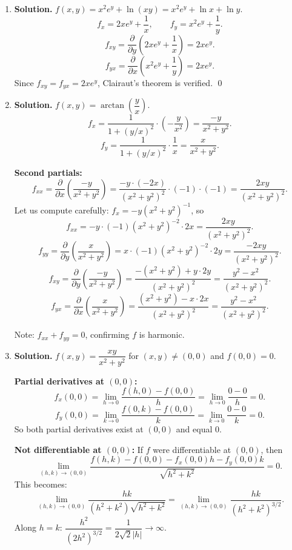 \begin{enumerate}
All mixed partials satisfy $f_{xy} = f_{yx}$, $f_{xz} = f_{zx}$, $f_{yz} = f_{zy}$.

\item \textbf{Solution.}
$f(x,y) = x^2e^y + \ln(xy) = x^2e^y + \ln x + \ln y$.
\[
f_x = 2xe^y + \frac{1}{x}, \qquad f_y = x^2e^y + \frac{1}{y}.
\]
\[
f_{xy} = \frac{\partial}{\partial y}\left(2xe^y + \frac{1}{x}\right) = 2xe^y.
\]
\[
f_{yx} = \frac{\partial}{\partial x}\left(x^2e^y + \frac{1}{y}\right) = 2xe^y.
\]
Since $f_{xy} = f_{yx} = 2xe^y$, Clairaut's theorem is verified. \qed

\item \textbf{Solution.}
$f(x,y) = \arctan\!\left(\dfrac{y}{x}\right)$.
\[
f_x = \frac{1}{1+(y/x)^2} \cdot \left(-\frac{y}{x^2}\right) = \frac{-y}{x^2+y^2}.
\]
\[
f_y = \frac{1}{1+(y/x)^2} \cdot \frac{1}{x} = \frac{x}{x^2+y^2}.
\]

\textbf{Second partials:}
\[
f_{xx} = \frac{\partial}{\partial x}\left(\frac{-y}{x^2+y^2}\right) = \frac{-y \cdot (-2x)}{(x^2+y^2)^2} \cdot (-1) \cdot (-1) = \frac{2xy}{(x^2+y^2)^2}.
\]
Let us compute carefully: $f_x = -y(x^2+y^2)^{-1}$, so
\[
f_{xx} = -y \cdot (-1)(x^2+y^2)^{-2} \cdot 2x = \frac{2xy}{(x^2+y^2)^2}.
\]
\[
f_{yy} = \frac{\partial}{\partial y}\left(\frac{x}{x^2+y^2}\right) = x \cdot (-1)(x^2+y^2)^{-2}\cdot 2y = \frac{-2xy}{(x^2+y^2)^2}.
\]
\[
f_{xy} = \frac{\partial}{\partial y}\left(\frac{-y}{x^2+y^2}\right) = \frac{-(x^2+y^2) + y \cdot 2y}{(x^2+y^2)^2} = \frac{y^2 - x^2}{(x^2+y^2)^2}.
\]
\[
f_{yx} = \frac{\partial}{\partial x}\left(\frac{x}{x^2+y^2}\right) = \frac{(x^2+y^2) - x \cdot 2x}{(x^2+y^2)^2} = \frac{y^2 - x^2}{(x^2+y^2)^2}.
\]

Note: $f_{xx} + f_{yy} = 0$, confirming $f$ is harmonic.

\item \textbf{Solution.}
$f(x,y) = \dfrac{xy}{x^2+y^2}$ for $(x,y) \neq (0,0)$ and $f(0,0) = 0$.

\textbf{Partial derivatives at $(0,0)$:}
\[
f_x(0,0) = \lim_{h \to 0}\frac{f(h,0)-f(0,0)}{h} = \lim_{h \to 0}\frac{0 - 0}{h} = 0.
\]
\[
f_y(0,0) = \lim_{k \to 0}\frac{f(0,k)-f(0,0)}{k} = \lim_{k \to 0}\frac{0 - 0}{k} = 0.
\]
So both partial derivatives exist at $(0,0)$ and equal 0.

\textbf{Not differentiable at $(0,0)$:}
If $f$ were differentiable at $(0,0)$, then
\[
\lim_{(h,k)\to(0,0)} \frac{f(h,k) - f(0,0) - f_x(0,0)h - f_y(0,0)k}{\sqrt{h^2+k^2}} = 0.
\]
This becomes:
\[
\lim_{(h,k)\to(0,0)} \frac{hk}{(h^2+k^2)\sqrt{h^2+k^2}} = \lim_{(h,k)\to(0,0)} \frac{hk}{(h^2+k^2)^{3/2}}.
\]
Along $h = k$: $\dfrac{h^2}{(2h^2)^{3/2}} = \dfrac{1}{2\sqrt{2}|h|} \to \infty$.


\end{enumerate}
